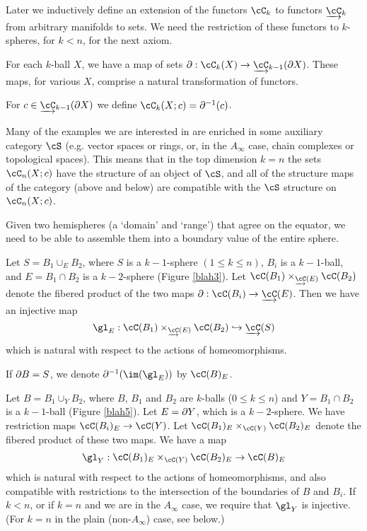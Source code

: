 \documentclass{pnastwo}
\begin{document}
\begin{article}
Later \todo{} we inductively define an extension of the functors $\cC_k$ to functors $\cl{\cC}_k$ from arbitrary manifolds to sets. We need the restriction of these functors to $k$-spheres, for $k<n$, for the next axiom.

\begin{axiom}[Boundaries]\label{nca-boundary}
For each $k$-ball $X$, we have a map of sets $\bd: \cC_k(X)\to \cl{\cC}_{k-1}(\bd X)$.
These maps, for various $X$, comprise a natural transformation of functors.
\end{axiom}

For $c\in \cl{\cC}_{k-1}(\bd X)$ we define $\cC_k(X; c) = \bd^{-1}(c)$.

Many of the examples we are interested in are enriched in some auxiliary category $\cS$
(e.g. vector spaces or rings, or, in the $A_\infty$ case, chain complexes or topological spaces).
This means that in the top dimension $k=n$ the sets $\cC_n(X; c)$ have the structure
of an object of $\cS$, and all of the structure maps of the category (above and below) are
compatible with the $\cS$ structure on $\cC_n(X; c)$.


Given two hemispheres (a `domain' and `range') that agree on the equator, we need to be able to assemble them into a boundary value of the entire sphere.

\begin{lem}
\label{lem:domain-and-range}
Let $S = B_1 \cup_E B_2$, where $S$ is a $k{-}1$-sphere $(1\le k\le n)$,
$B_i$ is a $k{-}1$-ball, and $E = B_1\cap B_2$ is a $k{-}2$-sphere (Figure \ref{blah3}).
Let $\cC(B_1) \times_{\cl{\cC}(E)} \cC(B_2)$ denote the fibered product of the 
two maps $\bd: \cC(B_i)\to \cl{\cC}(E)$.
Then we have an injective map
\[
	\gl_E : \cC(B_1) \times_{\cl{\cC}(E)} \cC(B_2) \into \cl{\cC}(S)
\]
which is natural with respect to the actions of homeomorphisms.
\end{lem}

If $\partial B = S$, we denote $\bdy^{-1}(\im(\gl_E))$ by $\cC(B)_E$.

\begin{axiom}[Gluing]
\label{axiom:composition}
Let $B = B_1 \cup_Y B_2$, where $B$, $B_1$ and $B_2$ are $k$-balls ($0\le k\le n$)
and $Y = B_1\cap B_2$ is a $k{-}1$-ball (Figure \ref{blah5}).
Let $E = \partial Y$, which is a $k{-}2$-sphere.
We have restriction maps $\cC(B_i)_E \to \cC(Y)$.
Let $\cC(B_1)_E \times_{\cC(Y)} \cC(B_2)_E$ denote the fibered product of these two maps. 
We have a map
\[
	\gl_Y : \cC(B_1)_E \times_{\cC(Y)} \cC(B_2)_E \to \cC(B)_E
\]
which is natural with respect to the actions of homeomorphisms, and also compatible with restrictions
to the intersection of the boundaries of $B$ and $B_i$.
If $k < n$,
or if $k=n$ and we are in the $A_\infty$ case, 
we require that $\gl_Y$ is injective.
(For $k=n$ in the plain (non-$A_\infty$) case, see below.)
\end{axiom}


\end{article}
\end{document}

